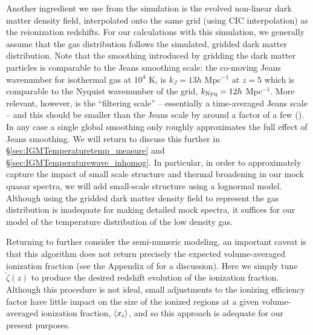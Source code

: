Another ingredient we use from the \citet{McQuinn:2007dy} simulation is the evolved non-linear
dark matter density field, interpolated onto the same grid (using CIC interpolation) as the reionization redshifts. For our calculations with this simulation, we generally assume that
the gas distribution follows the simulated, gridded dark matter distribution. Note that the smoothing introduced by gridding the dark matter particles is
comparable to the Jeans smoothing scale:
the co-moving Jeans wavenumber for isothermal gas
at $10^4$ K, is $k_J = 13 h$ Mpc$^{-1}$ at $z=5$ which is comparable to the Nyquist wavenumber of the grid, $k_{\rm Nyq} = 12 h$ Mpc$^{-1}$.
More relevant, however, is the ``filtering scale'' -- essentially a time-averaged Jeans scale -- and this should be smaller than the Jeans scale by around a factor of a few (\citealt{Gnedin:1997td}). In any case a single global smoothing only roughly approximates the full effect of Jeans smoothing. We will return to discuss this further in \S \ref{sec:IGMTemperaturetemp_measure} and \S \ref{sec:IGMTemperaturewave_inhomog}. In particular, in order to approximately 
capture the impact of small scale structure and thermal broadening in our mock quasar spectra, we will add small-scale structure using a lognormal model. Although using the gridded dark matter density field to represent the gas distribution is inadequate for making detailed mock spectra, it suffices for our model of the temperature distribution of the low density gas.

Returning to further consider the semi-numeric modeling, an important caveat is that this algorithm does not return precisely the
expected volume-averaged ionization fraction (see the Appendix of \citealt{Zahn:2006sg} for a discussion). 
Here we simply tune $\tilde{\zeta}(z)$
to produce the desired redshift evolution of the ionization fraction. 
Although this procedure is not
ideal, small adjustments to the ionizing efficiency factor have little impact on 
the size of the ionized regions at a given volume-averaged ionization fraction, $\langle x_i \rangle$,
and so this approach is adequate for our present purposes.


